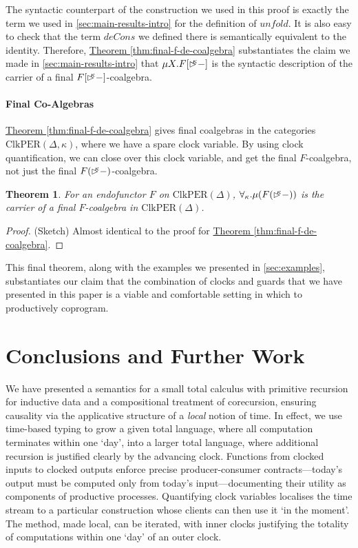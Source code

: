 \documentclass[natbib]{sigplanconf}
\newcommand{\ident}[1]{\textit{#1}}
\newcommand{\delay}[1]{\mathord{\rhd\kern-0.4em^{#1}}}
\newcommand{\ClkPER}{\mathrm{ClkPER}}
\newtheorem{theorem}{Theorem}
\newcommand{\thmref}[1]{\hyperref[#1]{Theorem \ref*{#1}}}
\begin{document}
The syntactic counterpart of the construction we used in this proof is
exactly the term we used in \autoref{sec:main-results-intro} for the
definition of $\ident{unfold}$. It is also easy to check that the term
$\ident{deCons}$ we defined there is semantically equivalent to the
identity. Therefore, \thmref{thm:final-f-de-coalgebra} substantiates
the claim we made in \autoref{sec:main-results-intro} that $\mu
X. F[\delay\kappa-]$ is the syntactic description of the carrier of a
final $F[\delay\kappa-]$-coalgebra.

\paragraph{Final Co-Algebras} \thmref{thm:final-f-de-coalgebra} gives
final coalgebras in the categories $\ClkPER(\Delta, \kappa)$, where we
have a spare clock variable. By using clock quantification, we can
close over this clock variable, and get the final
$F$-coalgebra, not just the final $F(\delay\kappa-)$-coalgebra.

\begin{theorem}\label{thm:final-f-coalgebra}
  For an endofunctor $F$ on $\ClkPER(\Delta)$, $\forall_\kappa. \mu
  (F(\delay\kappa-))$ is the carrier of a final $F$-coalgebra in
  $\ClkPER(\Delta)$.
\end{theorem}

\begin{proof}
  (Sketch) Almost identical to the proof for
  \thmref{thm:final-f-de-coalgebra}.
\end{proof}

This final theorem, along with the examples we presented in
\autoref{sec:examples}, substantiates our claim that the combination
of clocks and guards that we have presented in this paper is a viable
and comfortable setting in which to productively coprogram.

\section{Conclusions and Further Work}
\label{sec:conclusions}

We have presented a semantics for a small total calculus with
primitive recursion for inductive data and a compositional treatment
of corecursion, ensuring causality via the applicative structure of a
\emph{local} notion of time. In effect, we use time-based typing to
grow a given total language, where all computation terminates within
one `day', into a larger total language, where additional recursion is
justified clearly by the advancing clock. Functions from clocked
inputs to clocked outputs enforce precise producer-consumer
contracts---today's output must be computed only from today's
input---documenting their utility as components of productive
processes. Quantifying clock variables localises the time stream to a
particular construction whose clients can then use it `in the moment'.
The method, made local, can be iterated, with inner clocks justifying
the totality of computations within one `day' of an outer clock.
\end{document}
